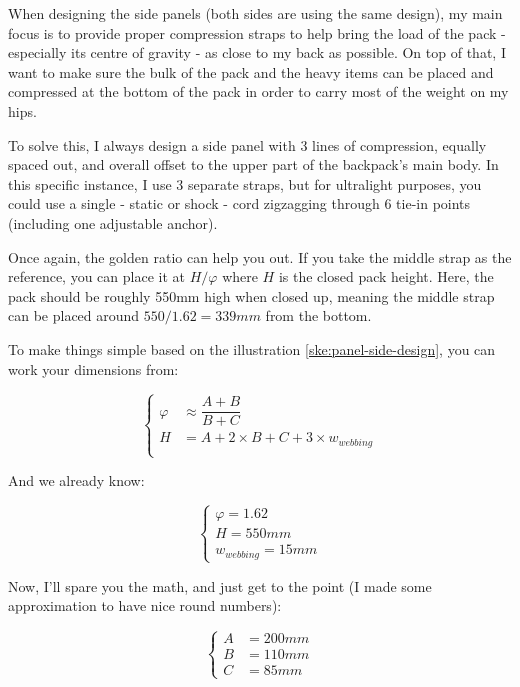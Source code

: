 When designing the side panels (both sides are using the same design), my main focus is to provide proper compression straps to help bring the load of the pack - especially its centre of gravity - as close to my back as possible. On top of that, I want to make sure the bulk of the pack and the heavy items can be placed and compressed at the bottom of the pack in order to carry most of the weight on my hips.

To solve this, I always design a side panel with 3 lines of compression, equally spaced out, and overall offset to the upper part of the backpack's main body. In this specific instance, I use 3 separate straps, but for ultralight purposes, you could use a single - static or shock - cord zigzagging through 6 tie-in points (including one adjustable anchor).

Once again, the golden ratio can help you out. If you take the middle strap as the reference, you can place it at $H / \varphi$ where $H$ is the closed pack height. Here, the pack should be roughly 550mm high when closed up, meaning the middle strap can be placed around $550 / 1.62 = 339mm$ from the bottom.

To make things simple based on the illustration \ref{ske:panel-side-design}, you can work your dimensions from:

\begin{equation}
  \left\{
    \begin{array}{rl}
     \varphi &\approx \dfrac{A+B}{B+C}\\
      H &= A+2 \times B+C + 3 \times w_{webbing}\\
    \end{array}
  \right.
\end{equation}

And we already know:

\begin{equation}
  \left\{
    \begin{array}{ll}
     \varphi = 1.62\\
      H = 550mm\\
      w_{webbing} = 15mm
    \end{array}
  \right.
\end{equation}

Now, I'll spare you the math, and just get to the point (I made some approximation to have nice round numbers):

\begin{equation}
  \left\{
    \begin{array}{rl}
      A &= 200mm\\
      B &= 110mm\\
      C &= 85mm
    \end{array}
  \right.
\end{equation}

